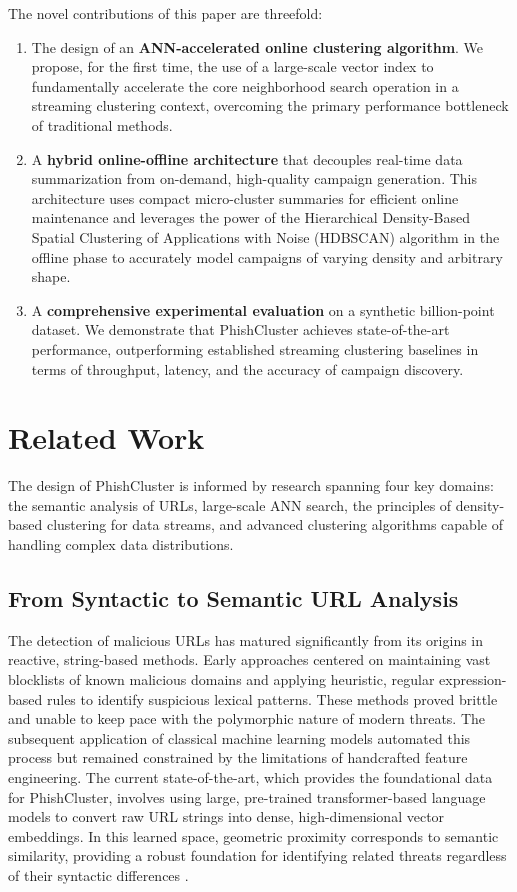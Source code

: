 \documentclass[journal,article,submit,pdftex,moreauthors]{Definitions/mdpi}
\begin{document}
The novel contributions of this paper are threefold:
\begin{enumerate}
    \item The design of an \textbf{ANN-accelerated online clustering algorithm}. We propose, for the first time, the use of a large-scale vector index to fundamentally accelerate the core neighborhood search operation in a streaming clustering context, overcoming the primary performance bottleneck of traditional methods.
    \item A \textbf{hybrid online-offline architecture} that decouples real-time data summarization from on-demand, high-quality campaign generation. This architecture uses compact micro-cluster summaries for efficient online maintenance and leverages the power of the Hierarchical Density-Based Spatial Clustering of Applications with Noise (HDBSCAN) algorithm in the offline phase to accurately model campaigns of varying density and arbitrary shape.
    \item A \textbf{comprehensive experimental evaluation} on a synthetic billion-point dataset. We demonstrate that PhishCluster achieves state-of-the-art performance, outperforming established streaming clustering baselines in terms of throughput, latency, and the accuracy of campaign discovery.
\end{enumerate}
\section{Related Work}

The design of PhishCluster is informed by research spanning four key domains: the semantic analysis of URLs, large-scale ANN search, the principles of density-based clustering for data streams, and advanced clustering algorithms capable of handling complex data distributions.

\subsection{From Syntactic to Semantic URL Analysis}

The detection of malicious URLs has matured significantly from its origins in reactive, string-based methods. Early approaches centered on maintaining vast blocklists of known malicious domains and applying heuristic, regular expression-based rules to identify suspicious lexical patterns. These methods proved brittle and unable to keep pace with the polymorphic nature of modern threats. The subsequent application of classical machine learning models automated this process but remained constrained by the limitations of handcrafted feature engineering. The current state-of-the-art, which provides the foundational data for PhishCluster, involves using large, pre-trained transformer-based language models to convert raw URL strings into dense, high-dimensional vector embeddings. In this learned space, geometric proximity corresponds to semantic similarity, providing a robust foundation for identifying related threats regardless of their syntactic differences \cite{ref_reimers}.
\end{document}
